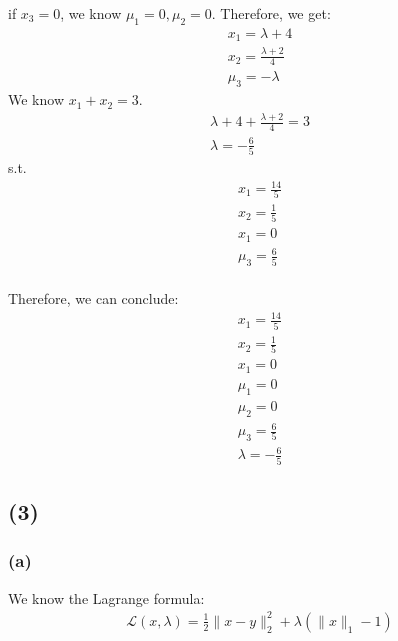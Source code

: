 \documentclass[12pt]{article}
\begin{document}
if \(x_3 = 0\), we know \(\mu_1 = 0, \mu_2 = 0\). Therefore, we get:
\begin{align*}
    x_1 = \lambda + 4 \\
    x_2 = \frac {\lambda + 2} {4} \\
    \mu_3 = -\lambda
\end{align*}
We know \(x_1 + x_2 = 3\).
\begin{align*}
    \lambda + 4 + \frac {\lambda + 2} {4} = 3 \\
    \lambda = -\frac{6}{5}
\end{align*}
s.t.
\begin{align*}
    x_1 = \frac{14}{5} \\
    x_2 = \frac{1}{5} \\
    x_1 = 0 \\
    \mu_3 = \frac{6}{5} \\
\end{align*}

Therefore, we can conclude:
\begin{align*}
    x_1 = \frac{14}{5} \\
    x_2 = \frac{1}{5} \\
    x_1 = 0 \\
    \mu_1 = 0 \\
    \mu_2 = 0 \\
    \mu_3 = \frac{6}{5} \\
    \lambda = -\frac{6}{5}
\end{align*}

\subsection{(3)}
\subsubsection{(a)}
We know the Lagrange formula:
\begin{align*}
    \mathcal{L}(x, \lambda) = \frac{1}{2} \|x - y\|_2^2 + \lambda(\|x\|_1 - 1)
\end{align*}
\end{document}
